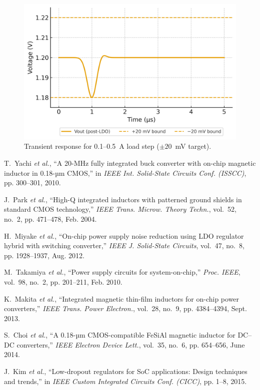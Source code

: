 \documentclass[conference]{IEEEtran}
\begin{document}
\begin{figure}[t]
  \centering
  \includegraphics[width=0.48\columnwidth]{fig5_transient_response.png}
  \caption{Transient response for 0.1--0.5~A load step ($\pm 20$~mV target).}
  \label{fig5}
\end{figure}

\begin{thebibliography}{10}

T.~Yachi \emph{et al.}, ``A 20-MHz fully integrated buck converter with on-chip magnetic inductor in 0.18-µm CMOS,'' in \emph{IEEE Int. Solid-State Circuits Conf. (ISSCC)}, pp. 300--301, 2010.

J.~Park \emph{et al.}, ``High-Q integrated inductors with patterned ground shields in standard CMOS technology,'' \emph{IEEE Trans. Microw. Theory Techn.}, vol.~52, no.~2, pp. 471--478, Feb. 2004.

H.~Miyake \emph{et al.}, ``On-chip power supply noise reduction using LDO regulator hybrid with switching converter,'' \emph{IEEE J. Solid-State Circuits}, vol.~47, no.~8, pp. 1928--1937, Aug. 2012.

M.~Takamiya \emph{et al.}, ``Power supply circuits for system-on-chip,'' \emph{Proc. IEEE}, vol.~98, no.~2, pp. 201--211, Feb. 2010.

K.~Makita \emph{et al.}, ``Integrated magnetic thin-film inductors for on-chip power converters,'' \emph{IEEE Trans. Power Electron.}, vol.~28, no.~9, pp. 4384--4394, Sept. 2013.

S.~Choi \emph{et al.}, ``A 0.18-µm CMOS-compatible FeSiAl magnetic inductor for DC--DC converters,'' \emph{IEEE Electron Device Lett.}, vol.~35, no.~6, pp. 654--656, June 2014.

J.~Kim \emph{et al.}, ``Low-dropout regulators for SoC applications: Design techniques and trends,'' in \emph{IEEE Custom Integrated Circuits Conf. (CICC)}, pp. 1--8, 2015.


\end{thebibliography}
\end{document}
